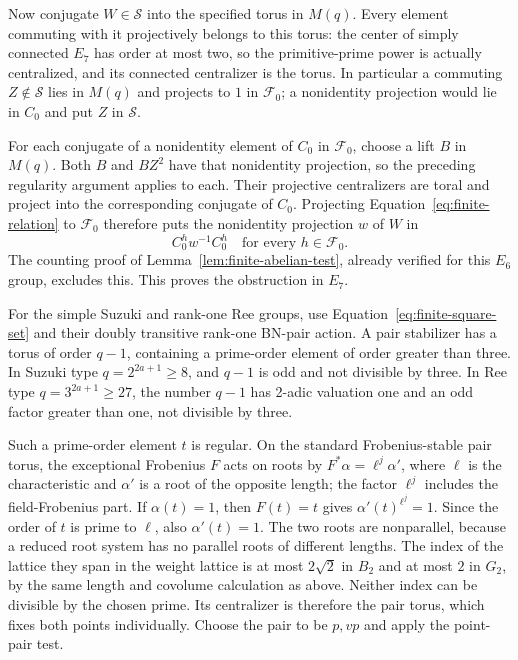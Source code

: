 Now conjugate $W\in\mathcal S$ into the specified torus in $M(q)$.
Every element commuting with it projectively belongs to this
torus: the center of simply connected $E_7$ has order at most
two, so the primitive-prime power is actually centralized, and
its connected centralizer is the torus. In particular a commuting
$Z\notin\mathcal S$ lies in $M(q)$ and projects to $1$ in
$\mathcal F_0$; a nonidentity projection would lie in $C_0$ and
put $Z$ in $\mathcal S$.

For each conjugate of a nonidentity element of $C_0$ in
$\mathcal F_0$, choose a lift $B$ in $M(q)$. Both $B$ and $BZ^2$
have that nonidentity projection, so the preceding regularity
argument applies to each. Their projective centralizers are
toral and project into the corresponding conjugate of $C_0$.
Projecting Equation~\eqref{eq:finite-relation} to $\mathcal F_0$
therefore puts the nonidentity projection $w$ of $W$ in
\[
 C_0^h w^{-1}C_0^h\quad\text{for every }h\in\mathcal F_0.
\]
The counting proof of Lemma~\ref{lem:finite-abelian-test}, already
verified for this $E_6$ group, excludes this. This proves the
obstruction in $E_7$.

For the simple Suzuki and rank-one Ree groups, use
Equation~\eqref{eq:finite-square-set} and their doubly transitive
rank-one BN-pair action. A pair stabilizer has a torus of order
$q-1$, containing a prime-order element of order greater than
three. In Suzuki type $q=2^{2a+1}\ge8$, and $q-1$ is odd and not
divisible by three. In Ree type $q=3^{2a+1}\ge27$, the number
$q-1$ has 2-adic valuation one and an odd factor greater than one,
not divisible by three.

Such a prime-order element $t$ is regular. On the standard
Frobenius-stable pair torus, the exceptional Frobenius $F$ acts
on roots by $F^*\alpha=\ell^j\alpha'$, where $\ell$ is the
characteristic and $\alpha'$ is a root of the opposite length;
the factor $\ell^j$ includes the field-Frobenius part.
If $\alpha(t)=1$, then $F(t)=t$ gives
$\alpha'(t)^{\ell^j}=1$. Since the order of $t$ is prime to
$\ell$, also $\alpha'(t)=1$. The two roots are nonparallel,
because a reduced root system has no parallel roots of different
lengths. The index of the
lattice they span in the weight lattice is at most $2\sqrt2$
in $B_2$ and at most $2$ in $G_2$, by the same length and
covolume calculation as above. Neither index can be divisible
by the chosen prime. Its centralizer is therefore the pair torus,
which fixes both points individually. Choose the pair to be
$p,vp$ and apply the point-pair test.

